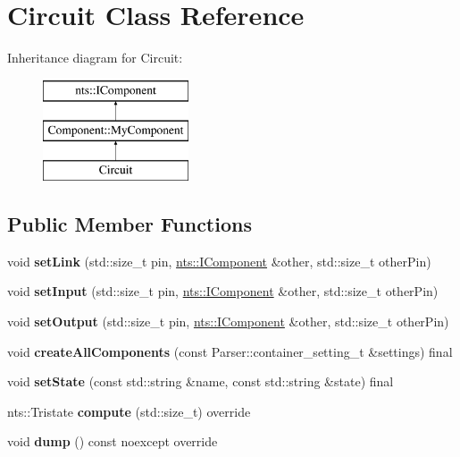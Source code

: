 \hypertarget{classCircuit}{}\section{Circuit Class Reference}
\label{classCircuit}
Inheritance diagram for Circuit\+:\begin{figure}[H]
\begin{center}
\leavevmode
\includegraphics[height=3.000000cm]{classCircuit}
\end{center}
\end{figure}
\subsection*{Public Member Functions}
\begin{DoxyCompactItemize}
\item 
\mbox{\label{classCircuit_ac3e4b6c48378994ee35289315eeb0951}} 
void {\bfseries set\+Link} (std\+::size\+\_\+t pin, \mbox{\hyperlink{classnts_1_1IComponent}{nts\+::\+I\+Component}} \&other, std\+::size\+\_\+t other\+Pin)
\item 
\mbox{\label{classCircuit_a7fdf649eb16d5d8f50b933f4ab7e3530}} 
void {\bfseries set\+Input} (std\+::size\+\_\+t pin, \mbox{\hyperlink{classnts_1_1IComponent}{nts\+::\+I\+Component}} \&other, std\+::size\+\_\+t other\+Pin)
\item 
\mbox{\label{classCircuit_a4cf8e76b22cc073499b5885dd11219a8}} 
void {\bfseries set\+Output} (std\+::size\+\_\+t pin, \mbox{\hyperlink{classnts_1_1IComponent}{nts\+::\+I\+Component}} \&other, std\+::size\+\_\+t other\+Pin)
\item 
\mbox{\label{classCircuit_ace2804eb8778c9b2ec7f78eb1ac5ab38}} 
void {\bfseries create\+All\+Components} (const Parser\+::container\+\_\+setting\+\_\+t \&settings) final
\item 
\mbox{\label{classCircuit_a6db179162b5e33f700d8509938c90c32}} 
void {\bfseries set\+State} (const std\+::string \&name, const std\+::string \&state) final
\item 
\mbox{\label{classCircuit_a737459bd18ae5b4bc73ff8a98c2241b6}} 
nts\+::\+Tristate {\bfseries compute} (std\+::size\+\_\+t) override
\item 
\mbox{\label{classCircuit_a65d35a6e4080bea4aa8be011ae2ab04d}} 
void {\bfseries dump} () const noexcept override
\end{DoxyCompactItemize}
